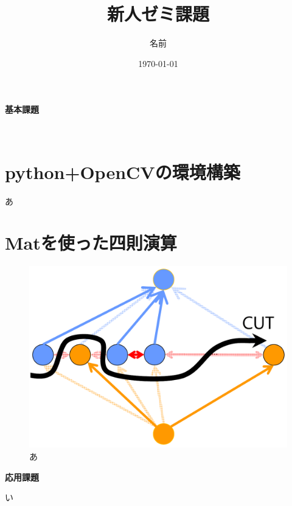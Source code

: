 
\graphicspath{{./pic/}}
\setlength{\textwidth}{16.2cm}%
\setlength{\textheight}{23cm}%
\setlength{\topmargin}{-1.5cm}
\setlength{\oddsidemargin}{0cm}
\setlength{\evensidemargin}{0cm}
\setlength{\parskip}{1pt}
\pagestyle{fancy}
\rhead[\today]{\today}
\title{新人ゼミ課題}
\author{名前}
\date{\today}


	
	\maketitle
	\vspace*{20pt}

	\begin{center}
		{\LARGE \bf 基本課題}
	\end{center}
　　　　\addtocounter{section}{-1}
	\section{python+OpenCVの環境構築}
	あ
	\section{Matを使った四則演算}
	\begin{figure}[h]
		\begin{center}
			\includegraphics[width=0.4\hsize]{a.pdf}
			\caption{あ}
			\label{Kinect_Coordinate_system}
		\end{center}
	\end{figure}
	
	\newpage
	\begin{center}
		{\LARGE \bf 応用課題}
	\end{center}
	
	い
	
	
	
	

